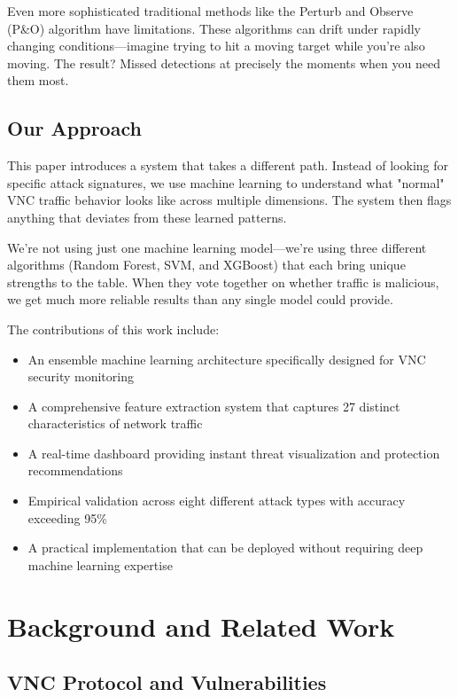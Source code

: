 \documentclass[conference]{IEEEtran}
\begin{document}
Even more sophisticated traditional methods like the Perturb and Observe (P\&O) algorithm have limitations. These algorithms can drift under rapidly changing conditions—imagine trying to hit a moving target while you're also moving. The result? Missed detections at precisely the moments when you need them most.

\subsection{Our Approach}

This paper introduces a system that takes a different path. Instead of looking for specific attack signatures, we use machine learning to understand what "normal" VNC traffic behavior looks like across multiple dimensions. The system then flags anything that deviates from these learned patterns.

We're not using just one machine learning model—we're using three different algorithms (Random Forest, SVM, and XGBoost) that each bring unique strengths to the table. When they vote together on whether traffic is malicious, we get much more reliable results than any single model could provide.

The contributions of this work include:
\begin{itemize}
\item An ensemble machine learning architecture specifically designed for VNC security monitoring
\item A comprehensive feature extraction system that captures 27 distinct characteristics of network traffic
\item A real-time dashboard providing instant threat visualization and protection recommendations
\item Empirical validation across eight different attack types with accuracy exceeding 95\%
\item A practical implementation that can be deployed without requiring deep machine learning expertise
\end{itemize}

\section{Background and Related Work}

\subsection{VNC Protocol and Vulnerabilities}
\end{document}
